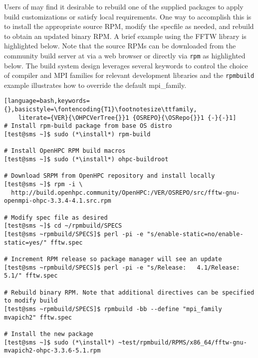 Users of \OHPC{} may find it desirable to rebuild one of the supplied packages
to apply build customizations or satisfy local requirements. One way to
accomplish this is to install the appropriate source RPM, modify the specfile
as needed, and rebuild to obtain an updated binary RPM. A brief example using
the FFTW library is highlighted below.  Note that the source RPMs can be downloaded from the
community build server at \href{https://build.openhpc.community}
{\color{blue}{https://build.openhpc.community}} via a web browser or directly
via \texttt{rpm} as highlighted below. The \OHPC{} build system design
leverages several keywords to control the choice of compiler and MPI families
for relevant development libraries and the \texttt{rpmbuild} example
illustrates how to override the default mpi\_family.

\begin{lstlisting}[language=bash,keywords={},basicstyle=\fontencoding{T1}\footnotesize\ttfamily,
    literate={VER}{\OHPCVerTree{}}1 {OSREPO}{\OSRepo{}}1 {-}{-}1]
# Install rpm-build package from base OS distro
[test@sms ~]$ sudo (*\install*) rpm-build

# Install OpenHPC RPM build macros
[test@sms ~]$ sudo (*\install*) ohpc-buildroot

# Download SRPM from OpenHPC repository and install locally
[test@sms ~]$ rpm -i \
  http://build.openhpc.community/OpenHPC:/VER/OSREPO/src/fftw-gnu-openmpi-ohpc-3.3.4-4.1.src.rpm

# Modify spec file as desired
[test@sms ~]$ cd ~/rpmbuild/SPECS
[test@sms ~rpmbuild/SPECS]$ perl -pi -e "s/enable-static=no/enable-static=yes/" fftw.spec

# Increment RPM release so package manager will see an update
[test@sms ~rpmbuild/SPECS]$ perl -pi -e "s/Release:   4.1/Release:   5.1/" fftw.spec

# Rebuild binary RPM. Note that additional directives can be specified to modify build
[test@sms ~rpmbuild/SPECS]$ rpmbuild -bb --define "mpi_family mvapich2" fftw.spec

# Install the new package
[test@sms ~]$ sudo (*\install*) ~test/rpmbuild/RPMS/x86_64/fftw-gnu-mvapich2-ohpc-3.3.6-5.1.rpm
\end{lstlisting}
